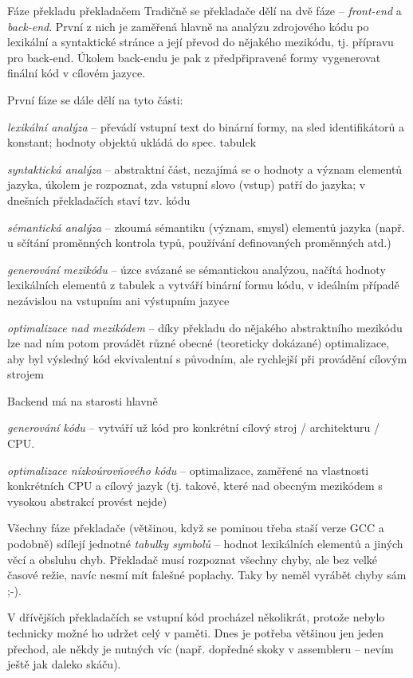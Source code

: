 \begin{obecne}{Fáze překladu překladačem}
Tradičně se překladače dělí na dvě fáze -- \emph{front-end} a \emph{back-end}. První z nich je zaměřená hlavně na analýzu zdrojového kódu po lexikální a syntaktické stránce a její převod do nějakého mezikódu, tj. přípravu pro back-end. Úkolem back-endu je pak z předpřipravené formy vygenerovat finální kód v cílovém jazyce.

První fáze se dále dělí na tyto části:
\begin{penumerate}
    \item \emph{lexikální analýza} -- převádí vstupní text do binární formy, na sled identifikátorů a konstant; hodnoty objektů ukládá do spec. tabulek 
    \item \emph{syntaktická analýza} -- abstraktní část, nezajímá se o hodnoty a význam elementů jazyka, úkolem je rozpoznat, zda vstupní slovo (vstup) patří do jazyka; v dnešních překladačích staví tzv.  kódu
    \item \emph{sémantická analýza} -- zkoumá sémantiku (význam, smysl) elementů jazyka (např. u sčítání proměnných kontrola typů, používání definovaných proměnných atd.)
    \item \emph{generování mezikódu} -- úzce svázané se sémantickou analýzou, načítá hodnoty lexikálních elementů z tabulek a vytváří binární formu kódu, v ideálním případě nezávislou na vstupním ani výstupním jazyce
    \item \emph{optimalizace nad mezikódem} -- díky překladu do nějakého abstraktního mezikódu lze nad ním potom provádět různé obecné (teoreticky dokázané) optimalizace, aby byl výsledný kód ekvivalentní s původním, ale rychlejší při provádění cílovým strojem
\end{penumerate}

Backend má na starosti hlavně
\begin{penumerate}
    \item \emph{generování kódu} -- vytváří už kód pro konkrétní cílový stroj / architekturu / CPU. 
    \item \emph{optimalizace nízkoúrovňového kódu} -- optimalizace, zaměřené na vlastnosti konkrétních CPU a cílový jazyk (tj. takové, které nad obecným mezikódem s vysokou abstrakcí provést nejde)
\end{penumerate}

Všechny fáze překladače (většinou, když se pominou třeba staší verze GCC a podobně) sdílejí jednotné \emph{tabulky symbolů} -- hodnot lexikálních elementů a jiných věcí a obsluhu chyb. Překladač musí rozpoznat všechny chyby, ale bez velké časové režie, navíc nesmí mít falešné poplachy. Taky by neměl vyrábět chyby sám ;-).

V dřívějších překladačích se vstupní kód procházel několikrát, protože nebylo technicky možné ho udržet celý v paměti. Dnes je potřeba většinou jen jeden přechod, ale někdy je nutných víc (např. dopředné skoky v assembleru -- nevím ještě jak daleko skáču).
\end{obecne}

